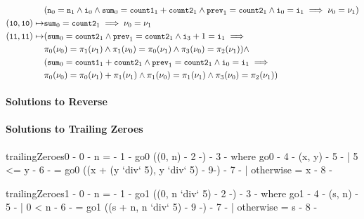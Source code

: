 \begin{align*}
  & (\cc{n}_0 = \cc{n}_1 \land \cc{i}_0 \land %
  \cc{sum}_0 = \cc{count1}_1 + \cc{count2}_1 \land %
  \cc{prev}_1 = \cc{count2}_1 \land %
  \cc{i}_0 = \cc{i}_1 \implies %
  \nu_0 = \nu_1) \\
  (\cc{10}, \cc{10}) \mapsto & \cc{sum}_0 = \cc{count2}_1 \implies %
  \nu_0 = \nu_1 \\
  (\cc{11}, \cc{11}) \mapsto & 
  (\cc{sum}_0 = \cc{count2}_1 \land %
  \cc{prev}_1 = \cc{count2}_1 \land %
  \cc{i}_3 + 1 = \cc{i}_1 \implies \\
  & \pi_0(\nu_0) = \pi_1(\nu_1) \land %
  \pi_1(\nu_0) = \pi_0(\nu_1) \land %
  \pi_3(\nu_0) = \pi_2(\nu_1)) \land \\
  & (\cc{sum}_0 = \cc{count1}_1 + \cc{count2}_1 \land %
  \cc{prev}_1 = \cc{count2}_1 \land %
  \cc{i}_0 = \cc{i}_1 \implies \\ %
  & \pi_0(\nu_0) = \pi_0(\nu_1) + \pi_1(\nu_1) \land %
  \pi_1(\nu_0) = \pi_1(\nu_1) \land %
  \pi_3(\nu_0) = \pi_2(\nu_1)) \\
\end{align*}
%
%



\paragraph{Solutions to Reverse}
%

\paragraph{Solutions to Trailing Zeroes}
\begin{hcode}
trailingZeroes0 {- 0 -} n 
 = {- 1 -} go0 ((0, n) {- 2 -}) {- 3 -}
  where
    go0 {- 4 -} (x, y) {- 5 -}
      | 5 <= y  {- 6 -}
      = go0 ((x + (y `div` 5), y `div` 5) {- 9-}) {- 7 -}
      | otherwise 
      = x {- 8 -}


trailingZeroes1 {- 0 -} n 
 = {- 1 -} go1 ((0, n `div` 5) {- 2 -}) {- 3 -}
  where 
    go1 {- 4 -} (s, n) {- 5 -}
      | 0 < n   {- 6 -} 
      = go1 ((s + n, n `div` 5) {- 9 -}) {- 7 -}
      | otherwise 
      = s {- 8 -}
\end{hcode}



